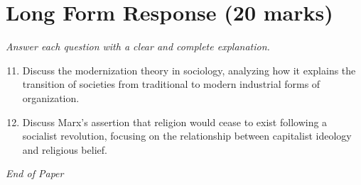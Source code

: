 \documentclass[12pt]{article}
\begin{document}
\section*{Long Form Response (20 marks)}
\textit{Answer each question with a clear and complete explanation.}
\begin{enumerate}[label=\arabic*.]
\setcounter{enumi}{10}
\item Discuss the modernization theory in sociology, analyzing how it explains the transition of societies from traditional to modern industrial forms of organization.
\item Discuss Marx's assertion that religion would cease to exist following a socialist revolution, focusing on the relationship between capitalist ideology and religious belief.
\end{enumerate}

\vfill
\noindent\textit{End of Paper}
\end{document}
